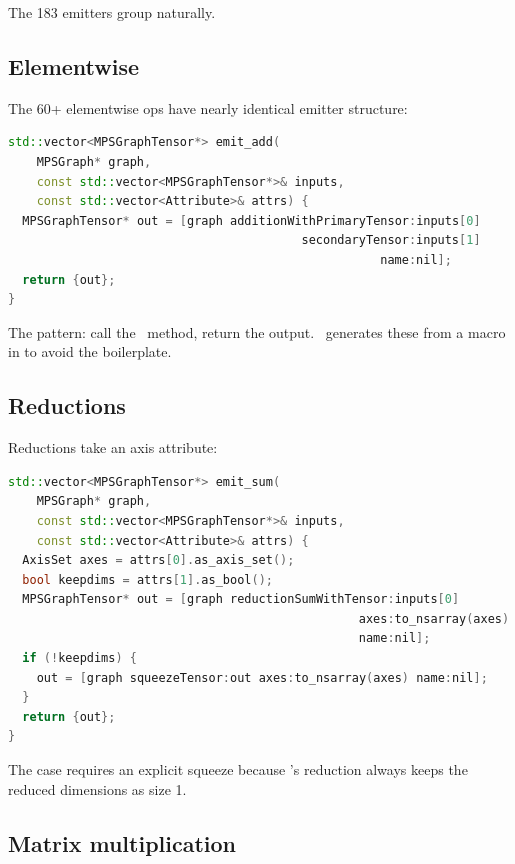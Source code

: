 The 183 emitters group naturally.

\subsection{Elementwise}
\label{ssec:op_emitters:elementwise}

The 60+ elementwise ops have nearly identical emitter
structure:

\begin{lstlisting}[style=lucidcpp,language=C++]
std::vector<MPSGraphTensor*> emit_add(
    MPSGraph* graph,
    const std::vector<MPSGraphTensor*>& inputs,
    const std::vector<Attribute>& attrs) {
  MPSGraphTensor* out = [graph additionWithPrimaryTensor:inputs[0]
                                         secondaryTensor:inputs[1]
                                                    name:nil];
  return {out};
}
\end{lstlisting}

The pattern: call the \MPSGraph\ method, return the output.
\Lucid\ generates these from a macro in 
to avoid the boilerplate.

\subsection{Reductions}
\label{ssec:op_emitters:reductions}

Reductions take an axis attribute:

\begin{lstlisting}[style=lucidcpp,language=C++]
std::vector<MPSGraphTensor*> emit_sum(
    MPSGraph* graph,
    const std::vector<MPSGraphTensor*>& inputs,
    const std::vector<Attribute>& attrs) {
  AxisSet axes = attrs[0].as_axis_set();
  bool keepdims = attrs[1].as_bool();
  MPSGraphTensor* out = [graph reductionSumWithTensor:inputs[0]
                                                 axes:to_nsarray(axes)
                                                 name:nil];
  if (!keepdims) {
    out = [graph squeezeTensor:out axes:to_nsarray(axes) name:nil];
  }
  return {out};
}
\end{lstlisting}

The  case requires an explicit squeeze
because \MPSGraph's reduction always keeps the reduced dimensions
as size 1.

\subsection{Matrix multiplication}
\label{ssec:op_emitters:matmul}

